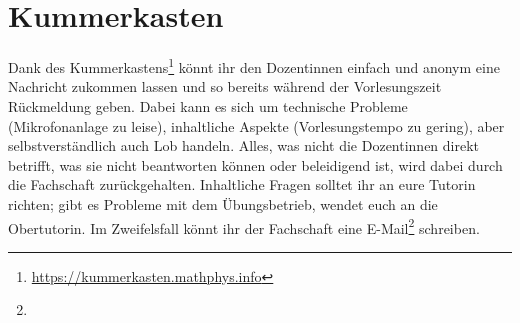 \section{Kummerkasten}
\label{kummerkasten}

Dank des Kummerkastens\footnote{\url{https://kummerkasten.mathphys.info}} könnt ihr den Dozentinnen einfach und anonym eine Nachricht zukommen lassen und so bereits während der Vorlesungszeit Rückmeldung geben. Dabei kann es sich um technische Probleme (Mikrofonanlage zu leise), inhaltliche Aspekte (Vorlesungstempo zu gering), aber selbstverständlich auch Lob handeln. Alles, was nicht die Dozentinnen direkt betrifft, was sie nicht beantworten können oder beleidigend ist, wird dabei durch die Fachschaft zurückgehalten. Inhaltliche Fragen solltet ihr an eure Tutorin richten; gibt es Probleme mit dem Übungsbetrieb, wendet euch an die Obertutorin. Im Zweifelsfall könnt ihr der Fachschaft eine E-Mail\footnote{} schreiben.
